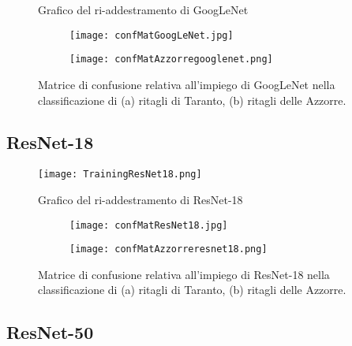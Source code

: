 \begin{appendices}
\begin{figure}[h!]
  \caption{Grafico del ri-addestramento di GoogLeNet}

\end{figure}


\begin{figure}[h!]
  \centering
  \begin{subfigure}[b]{0.45\linewidth}
    \texttt{[image: confMatGoogLeNet.jpg]}
    \caption{}
  \end{subfigure}
  \begin{subfigure}[b]{0.45\linewidth}
    \texttt{[image: confMatAzzorregooglenet.png]}
    \caption{}
  \end{subfigure}
  
  \caption{Matrice di confusione relativa all'impiego di GoogLeNet nella classificazione di (a) ritagli di Taranto, (b) ritagli delle Azzorre.}

\end{figure}

\vfill
\pagebreak[4]

\subsection{ResNet-18}

\begin{figure}[h]
  \centering
  \texttt{[image: TrainingResNet18.png]}
  
  \caption{Grafico del ri-addestramento di ResNet-18}

\end{figure}


\begin{figure}[h!]
  \centering
  \begin{subfigure}[b]{0.45\linewidth}
    \texttt{[image: confMatResNet18.jpg]}
    \caption{}
  \end{subfigure}
  \begin{subfigure}[b]{0.45\linewidth}
    \texttt{[image: confMatAzzorreresnet18.png]}
    \caption{}
  \end{subfigure}
  
  \caption{Matrice di confusione relativa all'impiego di ResNet-18 nella classificazione di (a) ritagli di Taranto, (b) ritagli delle Azzorre.}

\end{figure}

\vfill
\pagebreak[4]

\subsection{ResNet-50}


\end{appendices}

